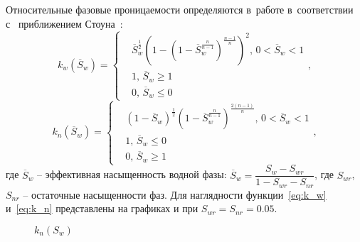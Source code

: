 Относительные фазовые проницаемости определяются в~работе в~соответствии с~
приближением Стоуна~\cite{Aziz-Settari}:
\begin{equation} \label{eq:k_w}
  k_{w}(\overline{S}_w)=
  \begin{cases}
  &\overline{S}_w^\frac{1}{2} \left( 1-\left( 1-\overline{S}_w^\frac{n}{n-1} \right) ^\frac{n-1}{n} \right) ^2,
  \, 0<\overline{S}_w<1 \\
  &1, \,\overline{S}_w\ge 1\\
  &0, \,\overline{S}_w\le 0
\end{cases},
\end{equation}
\begin{equation} \label{eq:k_n}
  k_{n}(\overline{S}_w)=
  \begin{cases}
  &(1-\overline{S}_w)^\frac{1}{2} \left(1-\overline{S}_w^\frac{n}{n-1} \right) ^\frac{2(n-1)}{n},
  \, 0<\overline{S}_w<1\\
  &1, \,\overline{S}_w\le 0\\
  &0, \, \overline{S}_w\ge 1
  \end{cases},
\end{equation}
где $\overline{S}_w$ -- эффективная насыщенность водной фазы:
$\overline{S}_w={\dfrac{S_w-S_{wr}}{1-S_{wr}-S_{nr}}}$, где $S_{wr}$,
$S_{nr}$ -- остаточные насыщенности фаз. Для наглядности функции~\eqref{eq:k_w} и~\eqref{eq:k_n}
представлены на графиках  и  при $S_{wr}=S_{nr}=0.05$.
\begin{figure}[H]
\begin{center}
\begin{minipage}[h!]{0.49\textwidth}
\caption{$k_w(S_w)$}
\label{k_w}
\end{minipage}
\hfill
\begin{minipage}[h!]{0.49\textwidth}
\caption{$k_n(S_w)$}
\label{k_n}
\end{minipage}
\end{center}
\end{figure}